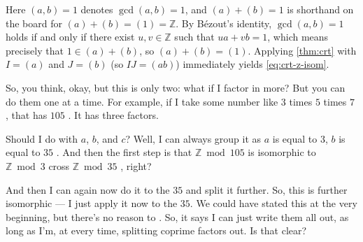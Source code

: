 \begin{content}

\begin{steps}
Here $(a, b) = 1$ denotes $\gcd(a, b) = 1$, and $(a) + (b) = 1$ is shorthand on the board for $(a) + (b) = (1) = \mathbb{Z}$. By B\'ezout's identity, $\gcd(a, b) = 1$ holds if and only if there exist $u, v \in \mathbb{Z}$ such that $ua + vb = 1$, which means precisely that $1 \in (a) + (b)$, so $(a) + (b) = (1)$. Applying \cref{thm:crt} with $I = (a)$ and $J = (b)$ (so $IJ = (ab)$) immediately yields \eqref{eq:crt-z-isom}.
\end{steps}
\end{content}

\begin{speech}[00:15:00 - 00:16:01]
So, you think, okay, but this is only two: what if I factor in more? But you can do them one at a time. For example, if I take some number like $3$ times $5$ times $7$ , that has $105$ . It has three factors.

Should I do with $a$, $b$, and $c$? Well, I can always group it as $a$ is equal to $3$, $b$ is equal to $35$ . And then the first step is that $\mathbb{Z} \bmod 105$ is isomorphic to $\mathbb{Z} \bmod 3$ cross $\mathbb{Z} \bmod 35$ , right?

And then I can again now do it to the $35$ and split it further. So, this is further isomorphic --- I just apply it now to the $35$. We could have stated this at the very beginning, but there's no reason to . So, it says I can just write them all out, as long as I'm, at every time, splitting coprime factors out. Is that clear?
\end{speech}

